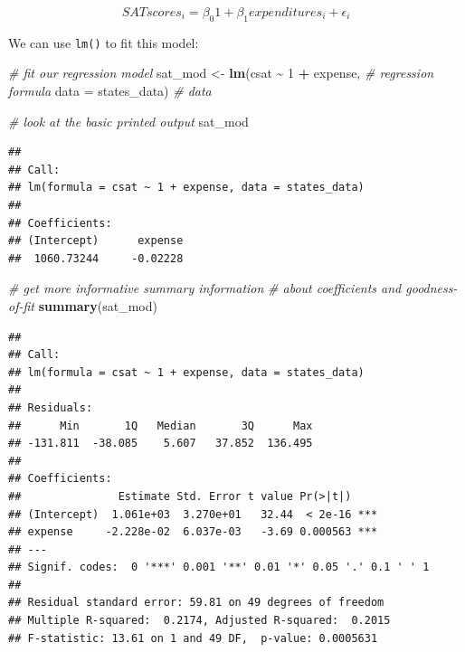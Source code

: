 \documentclass[
]{book}
\newenvironment{Shaded}{\begin{snugshade}}{\end{snugshade}}
\newcommand{\CommentTok}[1]{\textcolor[rgb]{0.56,0.35,0.01}{\textit{#1}}}
\newcommand{\DataTypeTok}[1]{\textcolor[rgb]{0.13,0.29,0.53}{#1}}
\newcommand{\DecValTok}[1]{\textcolor[rgb]{0.00,0.00,0.81}{#1}}
\newcommand{\KeywordTok}[1]{\textcolor[rgb]{0.13,0.29,0.53}{\textbf{#1}}}
\newcommand{\NormalTok}[1]{#1}
\newcommand{\OperatorTok}[1]{\textcolor[rgb]{0.81,0.36,0.00}{\textbf{#1}}}
\newcommand{\StringTok}[1]{\textcolor[rgb]{0.31,0.60,0.02}{#1}}
\begin{document}
\begin{alert}

\[
SATscores_i = \beta_{0}1 + \beta_1expenditures_i + \epsilon_i
\]

\end{alert}

We can use \texttt{lm()} to fit this model:

\begin{Shaded}
\begin{Highlighting}[]
  \CommentTok{\# fit our regression model}
\NormalTok{  sat\_mod \textless{}{-}}\StringTok{ }\KeywordTok{lm}\NormalTok{(csat }\OperatorTok{\textasciitilde{}}\StringTok{ }\DecValTok{1} \OperatorTok{+}\StringTok{ }\NormalTok{expense, }\CommentTok{\# regression formula}
                \DataTypeTok{data =}\NormalTok{ states\_data) }\CommentTok{\# data }

  \CommentTok{\# look at the basic printed output}
\NormalTok{  sat\_mod}
\end{Highlighting}
\end{Shaded}

\begin{verbatim}
## 
## Call:
## lm(formula = csat ~ 1 + expense, data = states_data)
## 
## Coefficients:
## (Intercept)      expense  
##  1060.73244     -0.02228
\end{verbatim}

\begin{Shaded}
\begin{Highlighting}[]
  \CommentTok{\# get more informative summary information }
  \CommentTok{\# about coefficients and goodness{-}of{-}fit}
  \KeywordTok{summary}\NormalTok{(sat\_mod)}
\end{Highlighting}
\end{Shaded}

\begin{verbatim}
## 
## Call:
## lm(formula = csat ~ 1 + expense, data = states_data)
## 
## Residuals:
##      Min       1Q   Median       3Q      Max 
## -131.811  -38.085    5.607   37.852  136.495 
## 
## Coefficients:
##               Estimate Std. Error t value Pr(>|t|)    
## (Intercept)  1.061e+03  3.270e+01   32.44  < 2e-16 ***
## expense     -2.228e-02  6.037e-03   -3.69 0.000563 ***
## ---
## Signif. codes:  0 '***' 0.001 '**' 0.01 '*' 0.05 '.' 0.1 ' ' 1
## 
## Residual standard error: 59.81 on 49 degrees of freedom
## Multiple R-squared:  0.2174, Adjusted R-squared:  0.2015 
## F-statistic: 13.61 on 1 and 49 DF,  p-value: 0.0005631
\end{verbatim}
\end{document}
